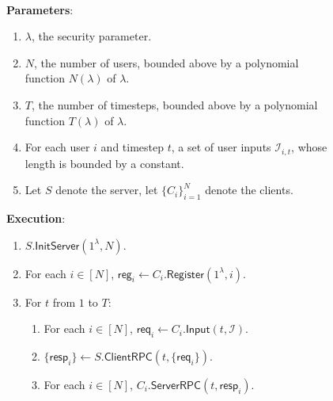 \documentclass[sigconf, nonacm, balance=false, natbib=false, screen]{acmart}
\newcommand{\reg}{\mathsf{reg}}
\newcommand{\req}{\mathsf{req}}
\newcommand{\resp}{\mathsf{resp}}
\newcommand{\cI}{\mathcal{I}}
\begin{document}
\begin{figure}[h!]
\begin{framed}
\begin{definition}  \hfill\\

\textbf{Parameters}: \begin{enumerate}
    \item $\lambda$, the security parameter.
    \item $N$, the number of users, bounded above by a polynomial function $N(\lambda)$ of $\lambda$.
    \item $T$, the number of timesteps, bounded above by a polynomial function $T(\lambda)$ of $\lambda$.
    \item For each user $i$ and timestep $t$, a set of user inputs $\cI_{i, t}$, whose length is bounded by a constant.
    \item Let $S$ denote the server, let $\{C_i\}_{i = 1}^N$ denote the clients.
\end{enumerate}
\textbf{Execution}:
\begin{enumerate}
\item $S.\mathsf{InitServer}(1^{\lambda}, N)$. 
\item For each $i \in [N]$, $\reg_i \leftarrow C_i.\mathsf{Register}(1^{\lambda}, i)$. 
\item For $t$ from $1$ to $T$:
    \begin{enumerate}
    \item For each $i \in [N]$, $\req_i \leftarrow C_i.\mathsf{Input}(t, \cI)$.
    
    \item $\{\resp_i\} \leftarrow S.\mathsf{ClientRPC}(t, \{\req_i\})$.
    
    \item For each $i \in [N]$, $C_i.\mathsf{ServerRPC}(t, \resp_i)$.
    \end{enumerate}
\end{enumerate}
\end{definition}
\end{framed}
\end{figure}
\end{document}
